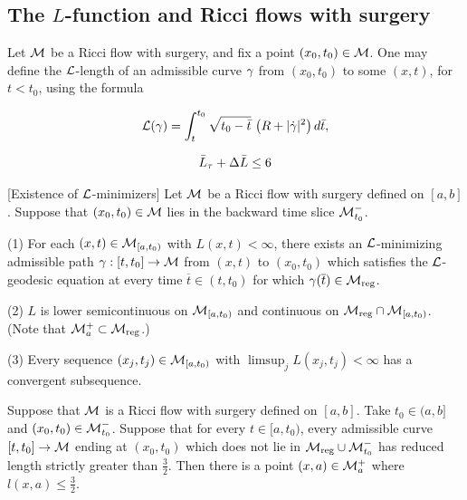 \subsection{The $L$-function and Ricci flows with surgery}
\label{lfunctionandsurgerysection}

Let ${\mathcal M}$ be a Ricci flow with surgery,
and fix a point $(x_0,t_0)\in{\mathcal M}$.   One may
define the ${\mathcal L}$-length of an  admissible curve $\gamma$ from
$(x_0,t_0)$ to some $(x,t)$, for $t<t_0$, using the formula

\begin{equation}
{\mathcal L}(\gamma)=\int_t^{t_0}\sqrt{t_0-\bar t}\,\left(R+|\dot{\gamma}|^2\right)d\bar t,
\end{equation}

\begin{equation} \label{newbarrier}
\bar L_\tau+\Delta \bar L\leq 6
\end{equation}

\begin{lemma}
  \label{lem:kl-reduced-l-geometry-existence-ricci-flow-surgery}
[Existence of ${\mathcal L}$-minimizers]
\label{minimizersexist}
Let ${\mathcal M}$ be a Ricci flow with surgery
defined on $ [a,b]$. Suppose that $(x_0,t_0)\in {\mathcal M}$ lies in the backward
time slice ${\mathcal M}_{t_0}^-$.

(1) For each $(x,t)\in {\mathcal M}_{[a,t_0)}$ with $L(x,t)<\infty$, there exists
an ${\mathcal L}$-minimizing admissible path $\gamma:[t,t_0]\rightarrow{\mathcal M}$ from $(x,t)$ to $(x_0,t_0)$
which satisfies the
${\mathcal L}$-geodesic equation at every time $\overline{t}\in (t,t_0)$ for which
$\gamma(\overline{t})\in{\mathcal M}_{\operatorname{reg}}$.


(2) $L$ is lower semicontinuous on
${\mathcal M}_{[a,t_0)}$
and continuous
on
${\mathcal M}_{\operatorname{reg}}\cap {\mathcal M}_{[a,t_0)}$. (Note that ${\mathcal M}_a^+ \subset {\mathcal M}_{\operatorname{reg}}$.)

(3) Every sequence $(x_j,t_j)\in {\mathcal M}_{[a,t_0)}$ with $\limsup_j L(x_j,t_j)<\infty$
has  a convergent subsequence.
\end{lemma}

\begin{lemma}
  \label{lem:kl-reduced-l-geometry-existence-reduced-length}

\label{stillleq3/2}
Suppose that ${\mathcal M}$ is a Ricci flow with surgery defined on $ [a,b]$.
Take
$t_0\in (a,b]$
and $(x_0,t_0)\in {\mathcal M}_{t_0}^-$.  Suppose that
for every $t \in [a, t_0)$, every admissible curve
$[t,t_0]\rightarrow{\mathcal M}$ ending at $(x_0,t_0)$ which does not lie
in
${\mathcal M}_{\operatorname{reg}}\cup  {\mathcal M}_{t_0}^-$
has reduced length strictly greater than $\frac{3}{2}$. Then
there is a point $(x,a)\in {\mathcal M}_a^+$ where $l(x,a)\leq \frac{3}{2}$.
\end{lemma}

